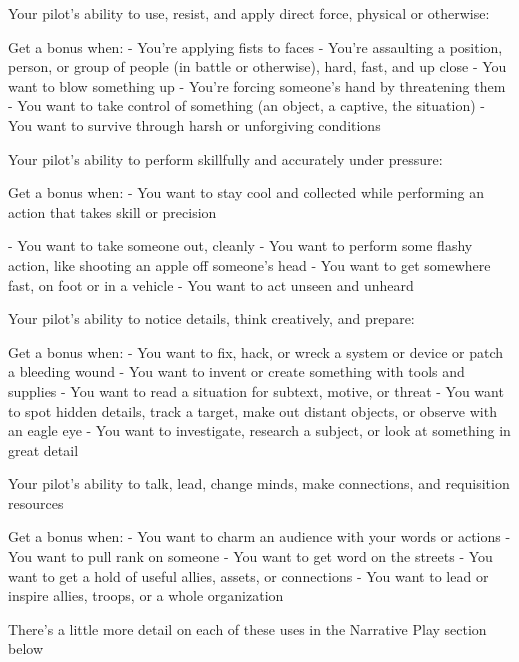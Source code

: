 Your pilot’s ability to use, resist, and apply direct force, physical or otherwise:  

Get a bonus when:  
          - You’re applying fists to faces  
          - You’re assaulting a position, person, or group of people (in battle or otherwise), hard,  
         fast, and up close  
          - You want to blow something up  
          - You’re forcing someone’s hand by threatening them  
          - You want to take control of something (an object, a captive, the situation)  
          - You want to survive through harsh or unforgiving conditions  

Your pilot’s ability to perform skillfully and accurately under pressure:  

Get a bonus when:  
         - You want to stay cool and collected while performing an action that takes skill or                          
         precision  

                                                                                                                      


         - You want to take someone out, cleanly  
         - You want to perform some flashy action, like shooting an apple off someone’s head  
         - You want to get somewhere fast, on foot or in a vehicle  
         - You want to act unseen and unheard  

Your pilot’s ability to notice details, think creatively, and prepare:  

Get a bonus when:  
         - You want to fix, hack, or wreck a system or device or patch a bleeding wound  
         - You want to invent or create something with tools and supplies  
         - You want to read a situation for subtext, motive, or threat  
         - You want to spot hidden details, track a target, make out distant objects, or observe with   
         an eagle eye  
         - You want to investigate, research a subject, or look at something in great detail  

Your pilot’s ability to talk, lead, change minds, make connections, and requisition  
resources  

Get a bonus when:  
         - You want to charm an audience with your words or actions  
         - You want to pull rank on someone  
         - You want to get word on the streets  
         - You want to get a hold of useful allies, assets, or connections  
         - You want to lead or inspire allies, troops, or a whole organization  

There’s a little more detail on each of these uses in the Narrative Play section below  

